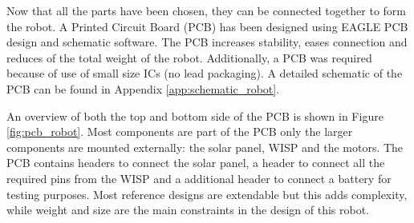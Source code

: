 Now that all the parts have been chosen, they can be connected together to form the robot.
A Printed Circuit Board (PCB) has been designed using EAGLE PCB design and schematic software.
The PCB increases stability, eases connection and reduces of the total weight of the robot.
Additionally, a PCB was required because of use of small size ICs (no lead packaging).
A detailed schematic of the PCB can be found in Appendix \ref{app:schematic_robot}.

An overview of both the top and bottom side of the PCB is shown in Figure \ref{fig:pcb_robot}.
Most components are part of the PCB only the larger components are mounted externally: the solar panel, WISP and the motors.
The PCB contains headers to connect the solar panel, a header to connect all the required pins from the WISP and a additional header to connect a battery for testing purposes.
Most reference designs are extendable but this adds complexity, while weight and size are the main constraints in the design of this robot.


